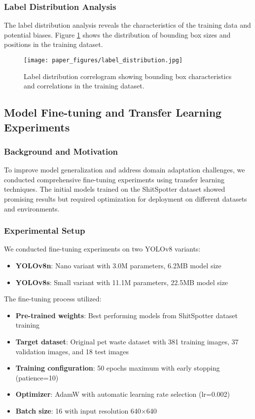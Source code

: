 \documentclass[12pt,a4paper]{article}
\begin{document}
\subsubsection{Label Distribution Analysis}
The label distribution analysis reveals the characteristics of the training data and potential biases. Figure \ref{fig:label_distribution} shows the distribution of bounding box sizes and positions in the training dataset.

\begin{figure}[H]
\centering
\texttt{[image: paper\_figures/label\_distribution.jpg]}
\caption{Label distribution correlogram showing bounding box characteristics and correlations in the training dataset.}
\label{fig:label_distribution}
\end{figure}

\subsection{Model Fine-tuning and Transfer Learning Experiments}

\subsubsection{Background and Motivation}
To improve model generalization and address domain adaptation challenges, we conducted comprehensive fine-tuning experiments using transfer learning techniques. The initial models trained on the ShitSpotter dataset showed promising results but required optimization for deployment on different datasets and environments.

\subsubsection{Experimental Setup}
We conducted fine-tuning experiments on two YOLOv8 variants:
\begin{itemize}
    \item \textbf{YOLOv8n}: Nano variant with 3.0M parameters, 6.2MB model size
    \item \textbf{YOLOv8s}: Small variant with 11.1M parameters, 22.5MB model size
\end{itemize}

The fine-tuning process utilized:
\begin{itemize}
    \item \textbf{Pre-trained weights}: Best performing models from ShitSpotter dataset training
    \item \textbf{Target dataset}: Original pet waste dataset with 381 training images, 37 validation images, and 18 test images
    \item \textbf{Training configuration}: 50 epochs maximum with early stopping (patience=10)
    \item \textbf{Optimizer}: AdamW with automatic learning rate selection (lr=0.002)
    \item \textbf{Batch size}: 16 with input resolution 640×640
\end{itemize}
\end{document}
